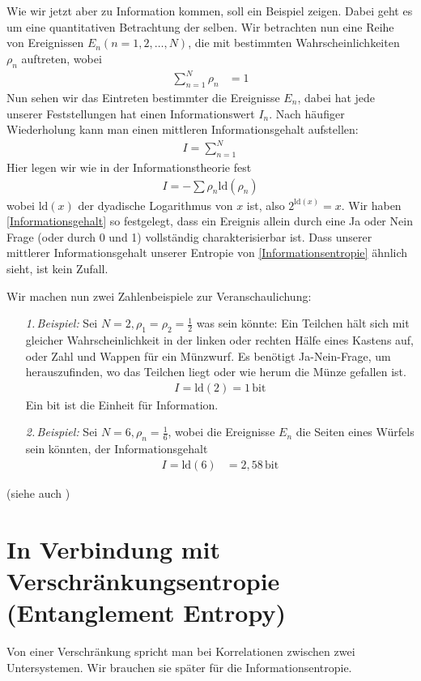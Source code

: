 \documentclass[ngerman]{scrartcl}
\begin{document}
Wie wir jetzt aber zu Information kommen, soll ein Beispiel zeigen. Dabei geht es um eine quantitativen Betrachtung der selben.
Wir betrachten nun eine Reihe von Ereignissen $E_n (n = 1, 2, \ldots, N)$, die mit bestimmten Wahrscheinlichkeiten $\rho_n$ auftreten, wobei
	\begin{align}
		\sum_{n=1}^N \rho_n &= 1
	\end{align}
Nun sehen wir das Eintreten bestimmter die Ereignisse $E_n$, dabei hat jede unserer Feststellungen hat einen Informationswert $I_n$. Nach häufiger Wiederholung kann man einen mittleren Informationsgehalt aufstellen:
	\begin{align}
		I = \sum_{n=1}^N
	\end{align}
Hier legen wir wie in der Informationstheorie fest
	\begin{align} \label{Informationsgehalt}
		I = - \sum \rho_n \mathrm{ld}(\rho_n)
	\end{align}
wobei $\mathrm{ld}(x)$ der dyadische Logarithmus von $x$ ist, also $2^{\mathrm{ld}(x)} = x$. 
Wir haben \eqref{Informationsgehalt} so festgelegt, dass ein Ereignis allein durch eine Ja oder Nein Frage (oder durch 0 und 1) vollständig charakterisierbar ist. 
Dass unserer mittlerer Informationsgehalt unserer Entropie von \eqref{Informationsentropie} ähnlich sieht, ist kein Zufall.

Wir machen nun zwei Zahlenbeispiele zur Veranschaulichung:
	\begin{itemize}
		\item[\textit{1.\,Beispiel:}] Sei $N=2, \rho_1 = \rho_2= \frac{1}{2}$ was sein könnte: Ein Teilchen hält sich mit gleicher Wahrscheinlichkeit in der linken oder rechten Hälfe eines Kastens auf, oder Zahl und Wappen für ein Münzwurf.
		Es benötigt Ja-Nein-Frage, um herauszufinden, wo das Teilchen liegt oder wie herum die Münze gefallen ist.
			\begin{align}
				I = \mathrm{ld}(2) = 1 \,\mathrm{bit}
			\end{align}
		Ein bit ist die Einheit für Information.
		\item[\textit{2.\,Beispiel:}]Sei $N=6, \rho_n = \frac{1}{6}$, wobei die Ereignisse $E_n$ die Seiten eines Würfels sein könnten, der Informationsgehalt
			\begin{align}
				I = \mathrm{ld}(6) &= 2,58 \,\mathrm{bit}
			\end{align}
	\end{itemize}
(siehe auch \cite{Brenig})

\section{In Verbindung mit Verschränkungsentropie (Entanglement Entropy)} %
Von einer Verschränkung spricht man bei Korrelationen zwischen zwei Untersystemen. Wir brauchen sie später für die Informationsentropie.
		
\end{document}

